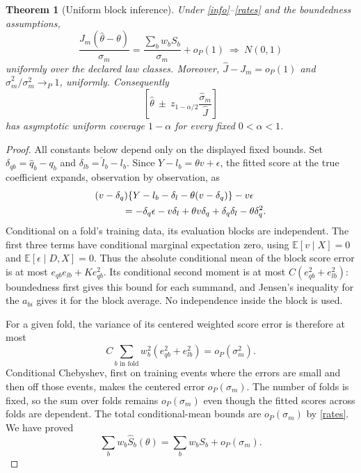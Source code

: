 \documentclass[11pt]{article}
\newtheorem{theorem}{Theorem}
\theoremstyle{remark}
\newcommand{\E}{\mathbb E}
\begin{document}
\begin{theorem}[Uniform block inference]\label{blockthm}
Under \eqref{info}--\eqref{rates} and the boundedness assumptions,
\[
 \frac{J_m(\widehat\theta-\theta)}{\sigma_m}
  =\frac{\sum_b w_bS_b}{\sigma_m}+o_P(1)
  \ \Longrightarrow\ N(0,1)
\]
uniformly over the declared law classes. Moreover,
$\widehat J-J_m=o_P(1)$ and
$\widehat\sigma_m^2/\sigma_m^2\to_P1$, uniformly.
Consequently
\[
 \left[\widehat\theta\ \pm\ z_{1-\alpha/2}
                     \frac{\widehat\sigma_m}{\widehat J}\right]
\]
has asymptotic uniform coverage $1-\alpha$ for every fixed $0<\alpha<1$.
\end{theorem}
\begin{proof}
All constants below depend only on the displayed fixed bounds. Set
$\delta_{qb}=\widehat q_b-q_b$ and $\delta_{lb}=\widehat l_b-l_b$.
Since $Y-l_b=\theta v+\epsilon$, the fitted score at the true coefficient expands, observation by observation, as
\begin{align}
 &(v-\delta_q)\{Y-l_b-\delta_l-\theta(v-\delta_q)\}-v\epsilon\nonumber\\
 &\hspace{10mm}=-\delta_q\epsilon-v\delta_l+\theta v\delta_q
                   +\delta_q\delta_l-\theta\delta_q^2.\label{expansion}
\end{align}
Conditional on a fold's training data, its evaluation blocks are independent. The first three terms have conditional marginal expectation zero, using $\E[v\mid X]=0$ and $\E[\epsilon\mid D,X]=0$. Thus the absolute conditional mean of the block score error is at most
$e_{qb}e_{lb}+K e_{qb}^2$. Its conditional second moment is at most
$C(e_{qb}^2+e_{lb}^2)$: boundedness first gives this bound for each summand, and Jensen's inequality for the $a_{bi}$ gives it for the block average. No independence inside the block is used.

For a given fold, the variance of its centered weighted score error is therefore at most
\[
 C\sum_{b\text{ in fold}}w_b^2(e_{qb}^2+e_{lb}^2)
       =o_P(\sigma_m^2).
\]
Conditional Chebyshev, first on training events where the errors are small and then off those events, makes the centered error $o_P(\sigma_m)$. The number of folds is fixed, so the sum over folds remains $o_P(\sigma_m)$ even though the fitted scores across folds are dependent. The total conditional-mean bounds are $o_P(\sigma_m)$ by \eqref{rates}. We have proved
\[
 \sum_b w_b\widehat S_b(\theta)=\sum_b w_bS_b+o_P(\sigma_m).
                                                        \tag{4}
\]


\end{proof}
\end{document}

